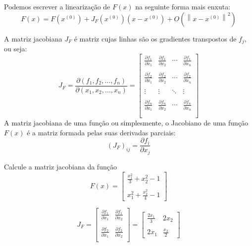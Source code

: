 Podemos escrever a linearização de $F(x)$ na seguinte forma mais enxuta:
$$F(x)=F\left(x^{(0)}\right)+ J_F(x^{(0)})\left(x-x^{(0)}\right) + O\left(\left\|x-x^{(0)}\right\|^2\right) $$

A matriz jacobiana $J_F$ é matriz cujas linhas são os gradientes transpostos de $f_j$, ou seja:
$$J_F= \frac{\partial(f_1,f_2,\ldots,f_n)}{\partial(x_1,x_2,\ldots,x_n)}=\left[
\begin{array}{ccccc}
\frac{\partial f_1}{\partial x_1}&\frac{\partial f_1}{\partial x_2}&\cdots&\frac{\partial f_1}{\partial x_n}\\~\\
\frac{\partial f_2}{\partial x_1}&\frac{\partial f_2}{\partial x_2}&\cdots&\frac{\partial f_2}{\partial x_n}\\~\\
\vdots&\vdots&\ddots&\vdots\\~\\
\frac{\partial f_n}{\partial x_1}&\frac{\partial f_n}{\partial x_2}&\cdots&\frac{\partial f_n}{\partial x_n}\\~\\
\end{array}
\right]
$$
A matriz jacobiana de uma função ou simplesmente, o Jacobiano de uma função $F(x)$ é a matriz formada pelas suas derivadas parciais:
$$\left(J_F\right)_{ij}=\frac{\partial f_i}{\partial x_j}$$


\begin{ex} Calcule a matriz jacobiana da função
$$F(x)=\left[
\begin{array}{c}
\frac{x_1^2}{3}+x_2^2-1\\~\\
x_1^2+\frac{x_2^2}{4}-1
\end{array}
\right]$$

$$J_F=\left[
\begin{array}{cc}
\frac{\partial f_1}{\partial x_1} & \frac{\partial f_1}{\partial x_2}\\~\\
\frac{\partial f_2}{\partial x_1} & \frac{\partial f_2}{\partial x_2}\\
\end{array}
\right]=\left[
\begin{array}{cc}
\frac{2x_1}{3} & 2x_2\\~\\
2x_1&\frac{x_2}{2}
\end{array}
\right]
$$
\end{ex}

% 